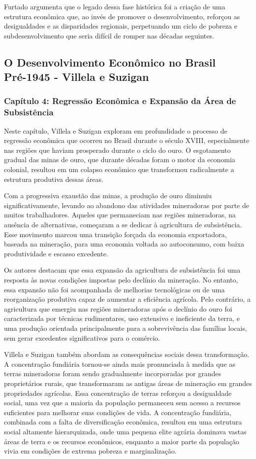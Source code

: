 \documentclass[a4paper,12pt]{article}[abntex2]
\begin{document}
Furtado argumenta que o legado dessa fase histórica foi a criação de uma estrutura econômica que, ao invés de promover o desenvolvimento, reforçou as desigualdades e as disparidades regionais, perpetuando um ciclo de pobreza e subdesenvolvimento que seria difícil de romper nas décadas seguintes.

\subsection{\textbf{O Desenvolvimento Econômico no Brasil Pré-1945 - Villela e Suzigan}}

\subsubsection{\textbf{Capítulo 4: Regressão Econômica e Expansão da Área de Subsistência}}

Neste capítulo, Villela e Suzigan exploram em profundidade o processo de regressão econômica que ocorreu no Brasil durante o século XVIII, especialmente nas regiões que haviam prosperado durante o ciclo do ouro. O esgotamento gradual das minas de ouro, que durante décadas foram o motor da economia colonial, resultou em um colapso econômico que transformou radicalmente a estrutura produtiva dessas áreas.

Com a progressiva exaustão das minas, a produção de ouro diminuiu significativamente, levando ao abandono das atividades mineradoras por parte de muitos trabalhadores. Aqueles que permaneciam nas regiões mineradoras, na ausência de alternativas, começaram a se dedicar à agricultura de subsistência. Esse movimento marcou uma transição forçada da economia exportadora, baseada na mineração, para uma economia voltada ao autoconsumo, com baixa produtividade e escasso excedente.

Os autores destacam que essa expansão da agricultura de subsistência foi uma resposta às novas condições impostas pelo declínio da mineração. No entanto, essa expansão não foi acompanhada de melhorias tecnológicas ou de uma reorganização produtiva capaz de aumentar a eficiência agrícola. Pelo contrário, a agricultura que emergiu nas regiões mineradoras após o declínio do ouro foi caracterizada por técnicas rudimentares, uso extensivo e ineficiente da terra, e uma produção orientada principalmente para a sobrevivência das famílias locais, sem gerar excedentes significativos para o comércio.

Villela e Suzigan também abordam as consequências sociais dessa transformação. A concentração fundiária tornou-se ainda mais pronunciada à medida que as terras mineradoras foram sendo gradualmente incorporadas por grandes proprietários rurais, que transformaram as antigas áreas de mineração em grandes propriedades agrícolas. Essa concentração de terras reforçou a desigualdade social, uma vez que a maioria da população permaneceu sem acesso a recursos suficientes para melhorar suas condições de vida. A concentração fundiária, combinada com a falta de diversificação econômica, resultou em uma estrutura social altamente hierarquizada, onde uma pequena elite agrária dominava vastas áreas de terra e os recursos econômicos, enquanto a maior parte da população vivia em condições de extrema pobreza e marginalização.
\end{document}
